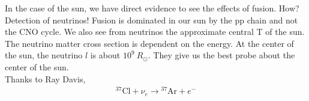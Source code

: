 In the case of the sun, we have direct evidence to see the effects of fusion. How? Detection of neutrinos! Fusion is dominated in our sun by the pp chain and not the CNO cycle. We also see from neutrinos the approximate central T of the sun. \\

The neutrino matter cross section is dependent on the energy. At the center of the sun, the neutrino $l$ is about $10^9~R_\odot$. They give us the best probe about the center of the sun. \\

Thanks to Ray Davis,
\begin{align}
\textrm{$^{37}$Cl}+ \nu_e \rightarrow \textrm{$^{37}$Ar} + e^-
\end{align}
